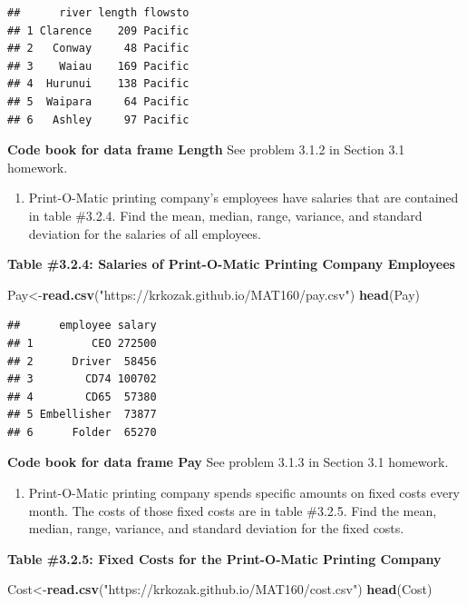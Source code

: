 \documentclass[]{book}
\newenvironment{Shaded}{\begin{snugshade}}{\end{snugshade}}
\newcommand{\KeywordTok}[1]{\textcolor[rgb]{0.13,0.29,0.53}{\textbf{#1}}}
\newcommand{\NormalTok}[1]{#1}
\newcommand{\StringTok}[1]{\textcolor[rgb]{0.31,0.60,0.02}{#1}}
\providecommand{\tightlist}{%
  \setlength{\itemsep}{0pt}\setlength{\parskip}{0pt}}
\begin{document}
\begin{verbatim}
##      river length flowsto
## 1 Clarence    209 Pacific
## 2   Conway     48 Pacific
## 3    Waiau    169 Pacific
## 4  Hurunui    138 Pacific
## 5  Waipara     64 Pacific
## 6   Ashley     97 Pacific
\end{verbatim}

\textbf{Code book for data frame Length} See problem 3.1.2 in Section 3.1 homework.

\begin{enumerate}
\def\labelenumi{\arabic{enumi}.}
\setcounter{enumi}{2}
\tightlist
\item
  Print-O-Matic printing company's employees have salaries that are contained in table \#3.2.4. Find the mean, median, range, variance, and standard deviation for the salaries of all employees.
\end{enumerate}

\textbf{Table \#3.2.4: Salaries of Print-O-Matic Printing Company Employees}

\begin{Shaded}
\begin{Highlighting}[]
\NormalTok{Pay<-}\KeywordTok{read.csv}\NormalTok{(}\StringTok{"https://krkozak.github.io/MAT160/pay.csv"}\NormalTok{)}
\KeywordTok{head}\NormalTok{(Pay)}
\end{Highlighting}
\end{Shaded}

\begin{verbatim}
##      employee salary
## 1         CEO 272500
## 2      Driver  58456
## 3        CD74 100702
## 4        CD65  57380
## 5 Embellisher  73877
## 6      Folder  65270
\end{verbatim}

\textbf{Code book for data frame Pay} See problem 3.1.3 in Section 3.1 homework.

\begin{enumerate}
\def\labelenumi{\arabic{enumi}.}
\setcounter{enumi}{3}
\tightlist
\item
  Print-O-Matic printing company spends specific amounts on fixed costs every month. The costs of those fixed costs are in table \#3.2.5. Find the mean, median, range, variance, and standard deviation for the fixed costs.
\end{enumerate}

\textbf{Table \#3.2.5: Fixed Costs for the Print-O-Matic Printing Company}

\begin{Shaded}
\begin{Highlighting}[]
\NormalTok{Cost<-}\KeywordTok{read.csv}\NormalTok{(}\StringTok{"https://krkozak.github.io/MAT160/cost.csv"}\NormalTok{)}
\KeywordTok{head}\NormalTok{(Cost)}
\end{Highlighting}
\end{Shaded}
\end{document}
